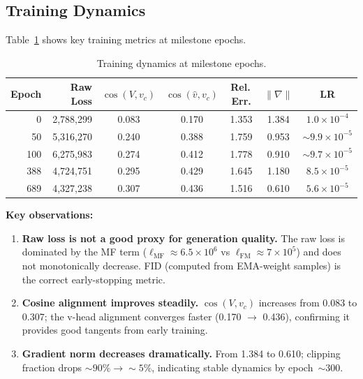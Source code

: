 \subsection{Training Dynamics}

Table~\ref{tab:dynamics} shows key training metrics at milestone epochs.

\begin{table}[ht]
\centering
\caption{Training dynamics at milestone epochs.}
\label{tab:dynamics}
\begin{tabular}{rrccccc}
\toprule
\textbf{Epoch} & \textbf{Raw Loss} & $\cos(V,v_c)$ & $\cos(\hat{v},v_c)$ & \textbf{Rel.\,Err.} & $\|\nabla\|$ & \textbf{LR} \\
\midrule
0   & 2,788,299 & 0.083 & 0.170 & 1.353 & 1.384 & $1.0\!\times\!10^{-4}$ \\
50  & 5,316,270 & 0.240 & 0.388 & 1.759 & 0.953 & ${\sim}9.9\!\times\!10^{-5}$ \\
100 & 6,275,983 & 0.274 & 0.412 & 1.778 & 0.910 & ${\sim}9.7\!\times\!10^{-5}$ \\
388 & 4,724,751 & 0.295 & 0.429 & 1.645 & 1.180 & $8.5\!\times\!10^{-5}$ \\
689 & 4,327,238 & 0.307 & 0.436 & 1.516 & 0.610 & $5.6\!\times\!10^{-5}$ \\
\bottomrule
\end{tabular}
\end{table}

\textbf{Key observations:}
\begin{enumerate}[nosep]
  \item \textbf{Raw loss is not a good proxy for generation quality.}  The raw
    loss is dominated by the MF term ($\ell_{\mathrm{MF}} \approx
    6.5\!\times\!10^6$ vs $\ell_{\mathrm{FM}} \approx
    7\!\times\!10^5$) and does not monotonically decrease.  FID (computed from
    EMA-weight samples) is the correct early-stopping metric.
  \item \textbf{Cosine alignment improves steadily.}  $\cos(V,v_c)$ increases
    from 0.083 to 0.307; the v-head alignment converges faster (0.170 $\to$
    0.436), confirming it provides good tangents from early training.
  \item \textbf{Gradient norm decreases dramatically.}  From 1.384 to 0.610;
    clipping fraction drops ${\sim}90\%\!\to\!{\sim}5\%$, indicating stable
    dynamics by epoch~${\sim}300$.
\end{enumerate}
